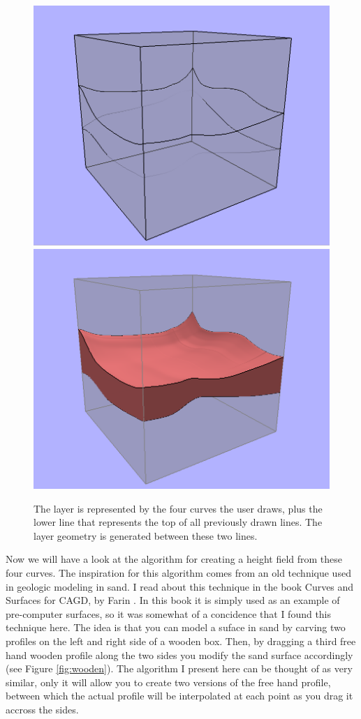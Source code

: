 \documentclass[a4paper,12pt]{report}
\begin{document}
\begin{figure}
\includegraphics[width=.5\linewidth]{thesis/layerRepresentation1.png}
\includegraphics[width=.5\linewidth]{thesis/layerRepresentation2.png}
 \caption{The layer is represented by the four curves the user draws, plus the lower line that represents the top of all previously drawn lines. The layer geometry is generated between these two lines.}
 \label{fig:layerRep}
\end{figure}


Now we will have a look at the algorithm for creating a height field from these four curves. The inspiration for this algorithm comes from an old technique used in geologic modeling in sand. I read about this technique in the book Curves and Surfaces for CAGD, by Farin \cite{farin2001curves}. In this book it is simply used as an example of pre-computer surfaces, so it was somewhat of a concidence that I found this technique here. The idea is that you can model a suface in sand by carving two profiles on the left and right side of a wooden box. Then, by dragging a third free hand wooden profile along the two sides you modify the sand surface accordingly (see Figure \ref{fig:wooden}). The algorithm I present here can be thought of as very similar, only it will allow you to create two versions of the free hand profile, between which the actual profile will be interpolated at each point as you drag it accross the sides.
\end{document}
